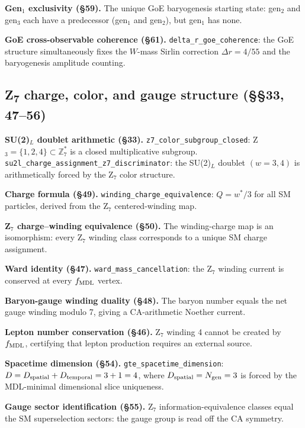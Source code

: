 \documentclass[11pt,a4paper]{article}
\theoremstyle{definition}
\begin{document}
\textbf{Gen$_1$ exclusivity (§59).}  The unique GoE baryogenesis starting state:
gen$_2$ and gen$_3$ each have a predecessor (gen$_1$ and gen$_2$), but gen$_1$ has none.

\textbf{GoE cross-observable coherence (§61).}
\lstinline|delta_r_goe_coherence|: the GoE structure simultaneously fixes the $W$-mass
Sirlin correction $\Delta r = 4/55$ and the baryogenesis amplitude counting.

\subsection{Z\textsubscript{7} charge, color, and gauge structure (§§33, 47--56)}\label{subsec:gut-z7charge}

\textbf{SU(2)$_L$ doublet arithmetic (§33).}
\lstinline|z7_color_subgroup_closed|: Z$_3 = \{1,2,4\}\subset\mathbb{Z}_7^*$ is
a closed multiplicative subgroup.
\lstinline|su2l_charge_assignment_z7_discriminator|: the SU(2)$_L$ doublet $(w=3,4)$
is arithmetically forced by the Z$_7$ color structure.

\textbf{Charge formula (§49).}  \lstinline|winding_charge_equivalence|:
$Q = w^*/3$ for all SM particles, derived from the Z$_7$ centered-winding map.

\textbf{Z$_7$ charge--winding equivalence (§50).}  The winding-charge map is an
isomorphism: every Z$_7$ winding class corresponds to a unique SM charge assignment.

\textbf{Ward identity (§47).}  \lstinline|ward_mass_cancellation|: the Z$_7$
winding current is conserved at every $f_{\rm MDL}$ vertex.

\textbf{Baryon-gauge winding duality (§48).}  The baryon number equals the net gauge
winding modulo 7, giving a CA-arithmetic Noether current.

\textbf{Lepton number conservation (§46).}  Z$_7$ winding 4 cannot be created by
$f_{\rm MDL}$, certifying that lepton production requires an external source.

\textbf{Spacetime dimension (§54).}  \lstinline|gte_spacetime_dimension|:
$D = D_{\rm spatial} + D_{\rm temporal} = 3 + 1 = 4$, where $D_{\rm spatial} = N_{\rm gen} = 3$
is forced by the MDL-minimal dimensional slice uniqueness.

\textbf{Gauge sector identification (§55).}  Z$_7$ information-equivalence classes
equal the SM superselection sectors: the gauge group is read off the CA symmetry.
\end{document}
